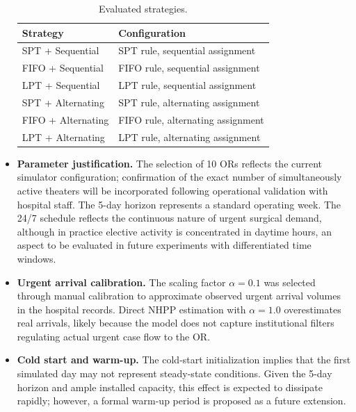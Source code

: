 \documentclass[sn-mathphys-num]{sn-jnl}
\begin{document}
\begin{itemize}
  \begin{table}[ht]
  \centering
  \caption{Evaluated strategies.}
  \label{tab:strategies}
  \begin{tabular}{ll}
  \toprule
  Strategy & Configuration \\
  \midrule
  SPT + Sequential  & SPT rule, sequential assignment \\
  FIFO + Sequential & FIFO rule, sequential assignment \\
  LPT + Sequential  & LPT rule, sequential assignment \\
  SPT + Alternating & SPT rule, alternating assignment \\
  FIFO + Alternating & FIFO rule, alternating assignment \\
  LPT + Alternating & LPT rule, alternating assignment \\
  \bottomrule
  \end{tabular}
  \end{table}

  \item \textbf{Parameter justification.}
  The selection of 10 ORs reflects the current simulator configuration;
  confirmation of the exact number of simultaneously active theaters
  will be incorporated following operational validation with hospital
  staff. The 5-day horizon represents a standard operating week. The
  24/7 schedule reflects the continuous nature of urgent surgical
  demand, although in practice elective activity is concentrated in
  daytime hours, an aspect to be evaluated in future experiments with
  differentiated time windows.

  \item \textbf{Urgent arrival calibration.}
  The scaling factor $\alpha = 0.1$ was selected through manual
  calibration to approximate observed urgent arrival volumes in the
  hospital records. Direct NHPP estimation with $\alpha = 1.0$
  overestimates real arrivals, likely because the model does not capture
  institutional filters regulating actual urgent case flow to the OR.

  \item \textbf{Cold start and warm-up.}
  The cold-start initialization implies that the first simulated day may
  not represent steady-state conditions. Given the 5-day horizon and
  ample installed capacity, this effect is expected to dissipate
  rapidly; however, a formal warm-up period is proposed as a future
  extension.

\end{itemize}
\end{document}
